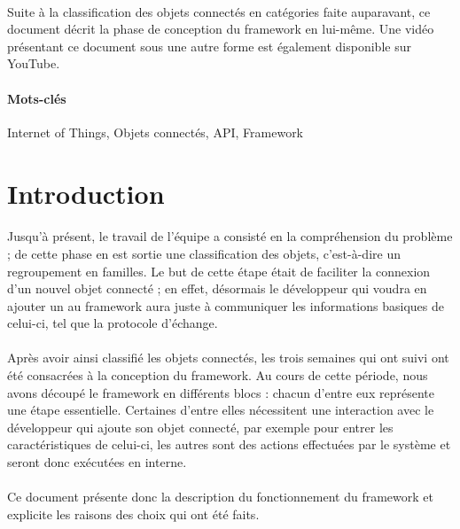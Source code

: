 \documentclass[nocopyrightspace]{sigplanconf}
\begin{document}
	\paragraph{}
	Suite à la classification des objets connectés en catégories faite auparavant, ce document décrit la phase de conception du framework en lui-même. Une vidéo présentant ce document sous une autre forme est également disponible sur YouTube\cite{video}.


\paragraph{Mots-clés}
Internet of Things, Objets connectés, API, Framework

\section{Introduction}
	\paragraph{}
	Jusqu’à présent, le travail de l’équipe a consisté en la compré\-hension du problème ; de cette phase en est sortie une classification des objets, c’est-à-dire un regroupement en familles. Le but de cette étape était de faciliter la connexion d’un nouvel objet connecté ; en effet, désormais le développeur qui voudra en ajouter un au framework aura juste à communiquer les informations basiques de celui-ci, tel que la protocole d’échange.

	\paragraph{}
	Après avoir ainsi classifié les objets connectés\cite{d2api}, les trois semaines qui ont suivi ont été consacrées à la conception du framework. Au cours de cette période, nous avons découpé le framework en différents blocs : chacun d’entre eux représente une étape essentielle. Certaines d’entre elles nécessitent une interaction avec le développeur qui ajoute son objet connecté, par exemple pour entrer les caractéristiques de celui-ci, les autres sont des actions effectuées par le système et seront donc exécutées en interne.

	\paragraph{}
	Ce document présente donc la description du fonctionnement du framework et explicite les raisons des choix qui ont été faits.
\end{document}
